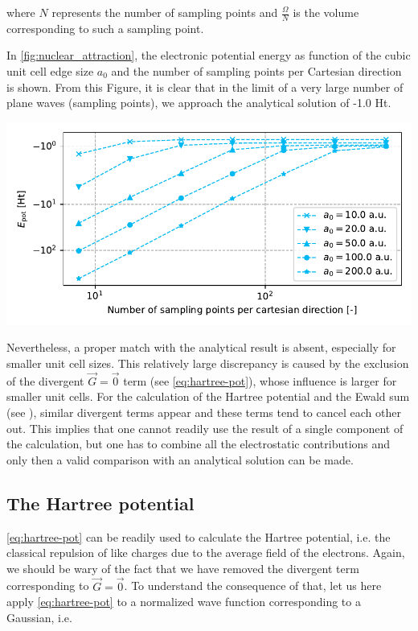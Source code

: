 where $N$ represents the number of sampling points and $\frac{\Omega}{N}$ is the volume corresponding to such a sampling point.

In \cref{fig:nuclear_attraction}, the electronic potential energy as function of the cubic unit cell edge size $a_{0}$ and the number of sampling points per Cartesian direction is shown. From this Figure, it is clear that in the limit of a very large number of plane waves (sampling points), we approach the analytical solution of -1.0 Ht.

\begin{Figure}
    \centering
    \includegraphics[width=\linewidth]{img/fig5_nuclear_attraction.pdf}
    \label{fig:nuclear_attraction}
\end{Figure}

Nevertheless, a proper match with the analytical result is absent, especially for smaller unit cell sizes. This relatively large discrepancy is caused by the exclusion of the divergent $\vec{G}=\vec{0}$ term (see \cref{eq:hartree-pot}), whose influence is larger for smaller unit cells. For the calculation of the Hartree potential and the Ewald sum (see ), similar divergent terms appear and these terms tend to cancel each other out. This implies that one cannot readily use the result of a single component of the calculation, but one has to combine all the electrostatic contributions and only then a valid comparison with an analytical solution can be made.

%
%
%
\subsection{The Hartree potential}

\cref{eq:hartree-pot} can be readily used to calculate the Hartree potential, i.e. the classical repulsion of like charges due to the average field of the electrons. Again, we should be wary of the fact that we have removed the divergent term corresponding to $\vec{G} = \vec{0}$. To understand the consequence of that, let us here apply \cref{eq:hartree-pot} to a normalized wave function corresponding to a Gaussian, i.e.

